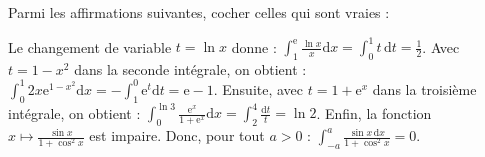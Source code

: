 \begin{question}
Parmi les affirmations suivantes, cocher celles qui sont vraies : 
\begin{answers}  
\end{answers}
\vskip3mm
\begin{explanations}
Le changement de variable $t=\ln x$ donne : $\displaystyle \int _1^{\mathrm{e}}\frac{\ln x}{x}\mathrm{d}x=\int _0^1t\, \mathrm{d}t=\frac{1}{2}$. Avec $t=1-x^2$ dans la seconde intégrale, on obtient : $\displaystyle \int _0^{1}2x\mathrm{e}^{1-x^2}\mathrm{d}x=-\int _{1}^0\mathrm{e}^{t}\mathrm{d}t=\mathrm{e}-1$. Ensuite, avec $t=1+\mathrm{e}^x$ dans la troisième intégrale, on obtient : $\displaystyle \int _0^{\ln 3}\frac{\mathrm{e}^x}{1+\mathrm{e}^x}\mathrm{d}x=\int _2^4\frac{\mathrm{d}t}{t}=\ln 2$. Enfin, la fonction $\displaystyle x\mapsto \frac{\sin x}{1+\cos ^2x}$ est impaire. Donc, pour tout $a>0$ : $\displaystyle \int _{-a}^{a}\frac{\sin x\, \mathrm{d}x}{1+\cos ^2x}=0$.
\end{explanations}
\end{question}


